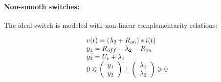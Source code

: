 \documentclass{article}
\def\geq{\geqslant}
\def\leq{\leqslant}
\begin{document}
\paragraph{Non-smooth switches:} The ideal switch is modeled with non-linear complementarity relations:

\begin{equation}
  \label{eq:63switch}
  \begin{array}[l]{l}
    v(t)=(\lambda_2+R_{on})*i(t) \\
    y_1=R_{off}-\lambda_2-R_{on}\\
    y_2=U_c+\lambda_1\\
    0 \leq \left(\begin{array}{c}
y_1\\
y_2
  \end{array}\right) \perp \left(\begin{array}{c}
\lambda_1\\
\lambda_2
  \end{array}\right) \geq 0
\end{array}
\end{equation}
\end{document}
